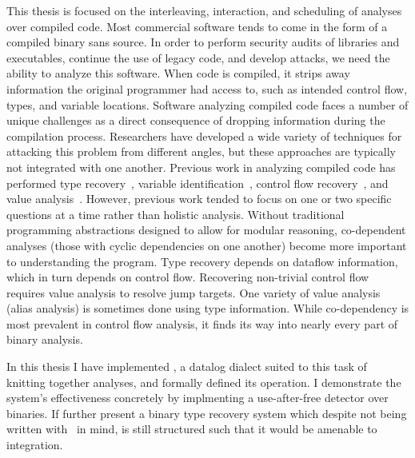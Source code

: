 This thesis is focused on the interleaving, interaction, and scheduling of analyses over compiled code.
Most commercial software tends to come in the form of a compiled binary sans source.
In order to perform security audits of libraries and executables, continue the use of legacy code, and develop attacks, we need the ability to analyze this software.
When code is compiled, it strips away information the original programmer had access to, such as intended control flow, types, and variable locations.
Software analyzing compiled code faces a number of unique challenges as a direct consequence of dropping information during the compilation process.
Researchers have developed a wide variety of techniques for attacking this problem from different angles, but these approaches are typically not integrated with one another.
Previous work in analyzing compiled code has performed type recovery~\cite{bitr}, variable identification~\cite{divine}, control flow recovery~\cite{jakstab,phoenix}, and value analysis~\cite{vsa}.
However, previous work tended to focus on one or two specific questions at a time rather than holistic analysis.
Without traditional programming abstractions designed to allow for modular reasoning, co-dependent analyses (those with cyclic dependencies on one another) become more important to understanding the program.
Type recovery depends on dataflow information\cite{bitr,tie,sndwrite}, which in turn depends on control flow.
Recovering non-trivial control flow requires value analysis to resolve jump targets.
One variety of value analysis (alias analysis) is sometimes done using type information.
While co-dependency is most prevalent in control flow analysis, it finds its way into nearly every part of binary analysis.

In this thesis I have implemented \sysname, a datalog dialect suited to this task of knitting together analyses, and formally defined its operation.
I demonstrate the system's effectiveness concretely by implmenting a use-after-free detector over binaries.
If further present a binary type recovery system which despite not being written with \sysname\ in mind, is still structured such that it would be amenable to integration.
